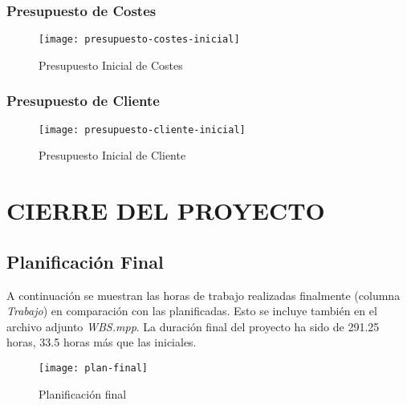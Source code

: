 \subsubsection{Presupuesto de Costes}
\begin{figure}[H]
\centering
\centerline{\texttt{[image: presupuesto-costes-inicial]}}
\caption{Presupuesto Inicial de Costes}
\end{figure} 

\subsubsection{Presupuesto de Cliente} 
\begin{figure}[H]
\centering
\centerline{\texttt{[image: presupuesto-cliente-inicial]}}
\caption{Presupuesto Inicial de Cliente}
\end{figure} 


%
%
%


\newpage
\section{CIERRE DEL PROYECTO}

\subsection{Planificación Final}
A continuación se muestran las horas de trabajo realizadas finalmente (columna \textit{Trabajo}) en comparación con las planificadas. Esto se incluye también en el archivo adjunto \textit{WBS.mpp}. La duración final del proyecto ha sido de 291.25 horas, 33.5 horas más que las iniciales.
\newpage
\pagestyle{empty}
\begin{figure}[H]
\vspace{-25mm}
\centering
\centerline{\texttt{[image: plan-final]}}
\caption{Planificación final}
\end{figure} 
\newpage
\pagestyle{fancy}
